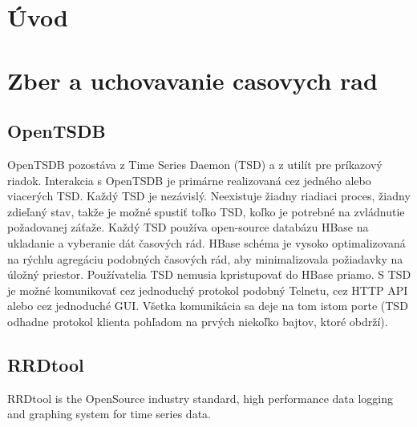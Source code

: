 \documentclass[11pt,final,oneside]{fithesis}
\begin{document}
\FrontMatter
\ThesisTitlePage

\begin{ThesisDeclaration}
\DeclarationText
\AdvisorName
\end{ThesisDeclaration}


\begin{ThesisThanks}
\end{ThesisThanks}

\begin{ThesisAbstract}
\end{ThesisAbstract}

\begin{ThesisKeyWords}
\end{ThesisKeyWords}

\tableofcontents
{}

\MainMatter
\chapter{Úvod}

\chapter{Zber a uchovavanie casovych rad}
\section{OpenTSDB}
OpenTSDB pozostáva z Time Series Daemon (TSD) a z utilít pre príkazový riadok. Interakcia s OpenTSDB je primárne realizovaná cez jedného alebo viacerých TSD. Každý TSD je nezávislý.
Neexistuje žiadny riadiaci proces, žiadny zdieľaný stav, takže je možné spustiť toľko TSD, koľko je potrebné na zvládnutie požadovanej záťaže. Každý TSD používa open-source databázu HBase
na ukladanie a vyberanie dát časových rád. HBase schéma je vysoko optimalizovaná na rýchlu agregáciu podobných časových rád, aby minimalizovala požiadavky na úložný priestor. 
Používatelia TSD nemusia kpristupovať do HBase priamo. S TSD je možné komunikovať cez jednoduchý protokol podobný Telnetu, cez HTTP API alebo cez jednoduché GUI. Všetka komunikácia
sa deje na tom istom porte (TSD odhadne protokol klienta pohľadom na prvých niekoľko bajtov, ktoré obdrží).\cite{openTSDB}

\section{RRDtool}
RRDtool is the OpenSource industry standard, high performance data logging and graphing system for time series data.
\end{document}
